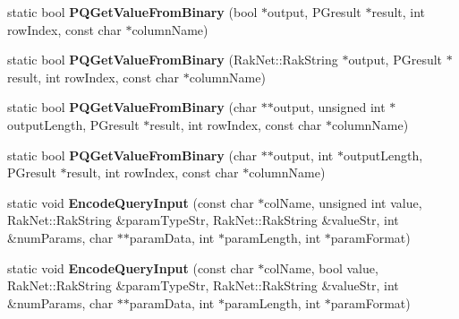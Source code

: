 \begin{DoxyCompactItemize}
\item 
\hypertarget{class_postgre_s_q_l_interface_a5d5016039feff442d532391867dd0750}{static bool {\bfseries P\-Q\-Get\-Value\-From\-Binary} (bool $\ast$output, P\-Gresult $\ast$result, int row\-Index, const char $\ast$column\-Name)}\label{class_postgre_s_q_l_interface_a5d5016039feff442d532391867dd0750}

\item 
\hypertarget{class_postgre_s_q_l_interface_af6d32518de06bdd6371c05360d33e598}{static bool {\bfseries P\-Q\-Get\-Value\-From\-Binary} (Rak\-Net\-::\-Rak\-String $\ast$output, P\-Gresult $\ast$result, int row\-Index, const char $\ast$column\-Name)}\label{class_postgre_s_q_l_interface_af6d32518de06bdd6371c05360d33e598}

\item 
\hypertarget{class_postgre_s_q_l_interface_a71b09da201d4d5c3e12dc427c7c394be}{static bool {\bfseries P\-Q\-Get\-Value\-From\-Binary} (char $\ast$$\ast$output, unsigned int $\ast$output\-Length, P\-Gresult $\ast$result, int row\-Index, const char $\ast$column\-Name)}\label{class_postgre_s_q_l_interface_a71b09da201d4d5c3e12dc427c7c394be}

\item 
\hypertarget{class_postgre_s_q_l_interface_af87cebd74372d9a5df2a03919cd044c9}{static bool {\bfseries P\-Q\-Get\-Value\-From\-Binary} (char $\ast$$\ast$output, int $\ast$output\-Length, P\-Gresult $\ast$result, int row\-Index, const char $\ast$column\-Name)}\label{class_postgre_s_q_l_interface_af87cebd74372d9a5df2a03919cd044c9}

\item 
\hypertarget{class_postgre_s_q_l_interface_a5cdc7fb071110c66d42af175a766ba41}{static void {\bfseries Encode\-Query\-Input} (const char $\ast$col\-Name, unsigned int value, Rak\-Net\-::\-Rak\-String \&param\-Type\-Str, Rak\-Net\-::\-Rak\-String \&value\-Str, int \&num\-Params, char $\ast$$\ast$param\-Data, int $\ast$param\-Length, int $\ast$param\-Format)}\label{class_postgre_s_q_l_interface_a5cdc7fb071110c66d42af175a766ba41}

\item 
\hypertarget{class_postgre_s_q_l_interface_ae515b265eb6d64a90b33fce80af5a874}{static void {\bfseries Encode\-Query\-Input} (const char $\ast$col\-Name, bool value, Rak\-Net\-::\-Rak\-String \&param\-Type\-Str, Rak\-Net\-::\-Rak\-String \&value\-Str, int \&num\-Params, char $\ast$$\ast$param\-Data, int $\ast$param\-Length, int $\ast$param\-Format)}\label{class_postgre_s_q_l_interface_ae515b265eb6d64a90b33fce80af5a874}


\end{DoxyCompactItemize}
